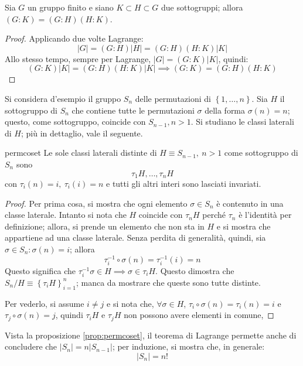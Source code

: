\documentclass[11pt, a4paper]{scrartcl}
\theoremstyle{definition}
\numberwithin{esempio}{section}
\theoremstyle{definition}
\numberwithin{obs}{section}
\numberwithin{nota}{section}
\numberwithin{equation}{subsection}
\begin{document}
\begin{corollario}
	{}{}
	Sia $G$ un gruppo finito e siano $K \subset H \subset G$ due sottogruppi; allora $(G:K) = (G:H)(H:K)$.
	\begin{proof}
Applicando due volte Lagrange:
\[
|G| = (G:H) |H| = (G:H) (H:K) |K|
\] 
Allo stesso tempo, sempre per Lagrange, $|G| = (G:K) |K|$, quindi:
\[
(G:K) |K| = (G:H)(H:K)|K|\implies (G:K)= (G:H)(H:K)
\] 
	\end{proof}
\end{corollario}

Si considera d'esempio il gruppo $S_n$ delle permutazioni di $\left\{ 1, \ldots , n \right\} $. 
Sia $H$ il sottogruppo di $S_n$ che contiene tutte le permutazioni $\sigma $ della forma $\sigma (n) = n $; questo, come sottogruppo, coincide con $S_{n-1} , n > 1$.
Si studiano le classi laterali di $H$; pi\`u in dettaglio, vale il seguente.
\begin{prop}
	{}{permcoset}
	Le sole classi laterali distinte di $H \equiv S_{n-1} , \ n > 1$ come sottogruppo di $S_n$ sono
	\begin{equation}
		\tau _1 H , \ldots , \tau _n H
	\end{equation}
	con $\tau _i (n) = i, \ \tau_i (i) =n$ e tutti gli altri interi sono lasciati invariati.
	\begin{proof}
		Per prima cosa, si mostra che ogni elemento $\sigma \in S_n$ \`e contenuto in una classe laterale. 
		Intanto si nota che $H$ coincide con $\tau _n H$ perch\'e $\tau _n$ \`e l'identit\`a per definizione;
		allora, si prende un elemento che non sta in $H$ e si mostra che appartiene ad una classe laterale.
		Senza perdita di generalit\`a, quindi, sia $\sigma \in S_n : \sigma (n ) = i$; allora
		\[
		\tau _i ^{-1} \circ \sigma (n) = \tau _i ^{-1} (i)= n 
		\] 
		Questo significa che $\tau ^{-1} _i \sigma \in H \implies \sigma \in \tau _i H$. 
		Questo dimostra che $S_n / H \equiv \left\{ \tau _i H  \right\} _{i=1} ^n$; manca da mostrare che queste sono tutte distinte.

		Per vederlo, si assume $i\neq j$ e si nota che, $\forall \sigma \in H$, $\tau _i \circ\sigma(n) = \tau _i (n) = i$ e $\tau _j \circ \sigma (n) = j$, quindi $\tau _i H$ e $\tau _j H$ non possono avere elementi in comune,
	\end{proof}
\end{prop} 
Vista la proposizione \ref{prop:permcoset}, il teorema di Lagrange permette anche di concludere che $|S_n| = n |S_{n-1} |$; per induzione, si mostra che, in generale:
\begin{equation}
	|S_n| = n!
\end{equation}
\end{document}
